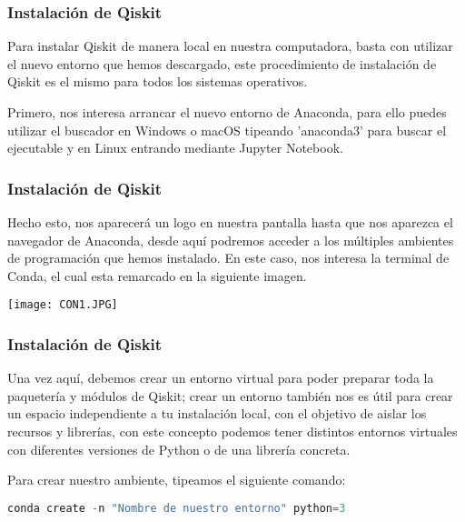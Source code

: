 \documentclass[spanish]{beamer}
\begin{document}
\begin{frame}[fragile]\frametitle{Instalación de Qiskit}
\justify\setlength{\parskip}{5mm}
Para instalar Qiskit de manera local en nuestra computadora, basta con utilizar el nuevo entorno que hemos descargado, este procedimiento de instalación de Qiskit es el mismo para todos los sistemas operativos.

Primero, nos interesa arrancar el nuevo entorno de Anaconda, para ello puedes utilizar el buscador en Windows o macOS tipeando 'anaconda3' para buscar el ejecutable y en Linux entrando mediante Jupyter Notebook.
\end{frame}
\begin{frame}[fragile]\frametitle{Instalación de Qiskit}
\justify\setlength{\parskip}{5mm}
Hecho esto, nos aparecerá un logo en nuestra pantalla hasta que nos aparezca el navegador de Anaconda, desde aquí podremos acceder a los múltiples ambientes de programación que hemos instalado. En este caso, nos interesa la terminal de Conda, el cual esta remarcado en la siguiente imagen.

\centering\texttt{[image: CON1.JPG]}

\end{frame}
\begin{frame}[fragile]\frametitle{Instalación de Qiskit}
\justify\setlength{\parskip}{5mm}
Una vez aquí, debemos crear un entorno virtual para poder preparar toda la paquetería y módulos de Qiskit; crear un entorno también nos es útil para crear un espacio independiente a tu instalación local, con el objetivo de aislar los recursos y librerías, con este concepto podemos tener distintos entornos virtuales con diferentes versiones de Python o de una librería concreta.

Para crear nuestro ambiente, tipeamos el siguiente comando:
\begin{lstlisting}[language=c++]
conda create -n "Nombre de nuestro entorno" python=3\end{lstlisting}
\end{frame}
\end{document}
